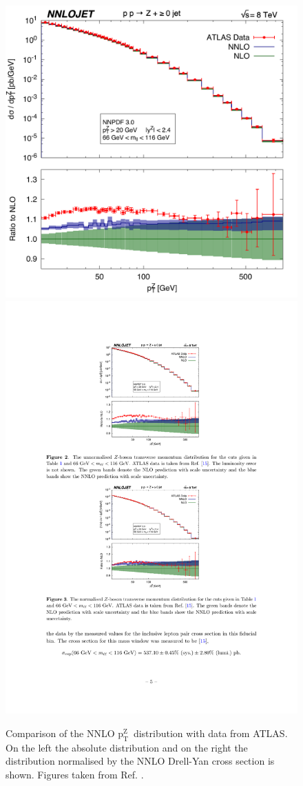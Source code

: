 \documentclass[a4paper,11pt,notoc]{article}
\newcommand{\ptZ}{\ensuremath{\mathrm{p_T^{Z}}}}
\begin{document}
\begin{figure}[t!]
\centering
\includegraphics[width=0.495\columnwidth]{ATLAS_ptz_bin_ratNLO_NNLOFull}
\includegraphics[width=0.495\columnwidth]{ptZNNLO.pdf} 
\caption{Comparison of the NNLO \ptZ\ distribution with data from ATLAS. 
On the left the absolute distribution and on the right the distribution normalised by the NNLO Drell-Yan cross section 
is shown.
Figures taken from Ref. \cite{Ridder:2016nkl}.}
\label{fig:ptZNNLO}
\end{figure}   
\end{document}
